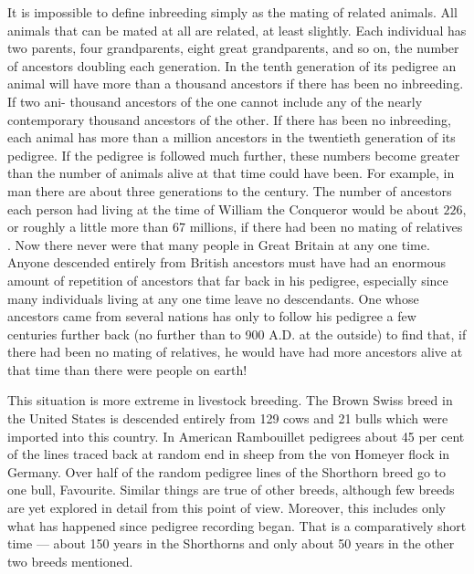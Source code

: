 It is impossible to define inbreeding simply as the mating of related
animals. All animals that can be mated at all are related, at least slightly.
Each individual has two parents, four grandparents, eight great
grandparents, and so on, the number of ancestors doubling each generation.
In the tenth generation of its pedigree an animal will have more
than a thousand ancestors if there has been no inbreeding. If two ani-
thousand ancestors of the one cannot include any of the nearly contemporary
thousand ancestors of the other. If there has been no inbreeding,
each animal has more than a million ancestors in the twentieth generation
of its pedigree. If the pedigree is followed much further, these
numbers become greater than the number of animals alive at that time
could have been. For example, in man there are about three generations
to the century. The number of ancestors each person had living at the
time of William the Conqueror would be about $2{26}$, or roughly a little
more than 67 millions, if there had been no mating of relatives . Now
there never were that many people in Great Britain at any one time.
Anyone descended entirely from British ancestors must have had an
enormous amount of repetition of ancestors that far back in his pedigree,
especially since many individuals living at any one time leave no
descendants. One whose ancestors came from several nations has only
to follow his pedigree a few centuries further back (no further than to
900 A.D. at the outside) to find that, if there had been no mating of relatives,
he would have had more ancestors alive at that time than there
were people on earth!

This situation is more extreme in livestock breeding. The Brown
Swiss breed in the United States is descended entirely from 129 cows
and 21 bulls which were imported into this country. In American Rambouillet
pedigrees about 45 per cent of the lines traced back at random
end in sheep from the von Homeyer flock in Germany. Over half of
the random pedigree lines of the Shorthorn breed go to one bull,
Favourite. Similar things are true of other breeds, although few breeds
are yet explored in detail from this point of view. Moreover, this
includes only what has happened since pedigree recording began. That
is a comparatively short time --- about 150 years in the Shorthorns and
only about 50 years in the other two breeds mentioned.

